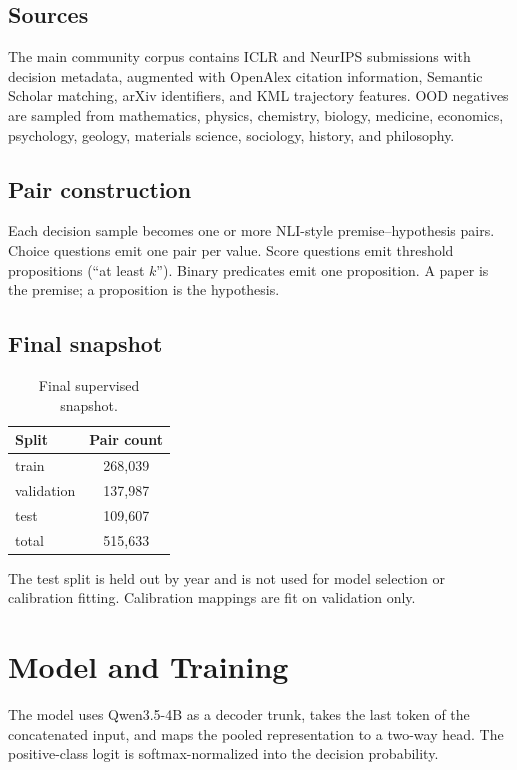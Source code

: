 \documentclass[11pt]{article}
\begin{document}
\subsection{Sources}

The main community corpus contains ICLR and NeurIPS submissions with decision
metadata, augmented with OpenAlex citation information, Semantic Scholar
matching, arXiv identifiers, and KML trajectory features. OOD negatives are
sampled from mathematics, physics, chemistry, biology, medicine, economics,
psychology, geology, materials science, sociology, history, and philosophy.

\subsection{Pair construction}

Each decision sample becomes one or more NLI-style premise--hypothesis pairs.
Choice questions emit one pair per value. Score questions emit threshold
propositions (``at least $k$''). Binary predicates emit one proposition. A paper
is the premise; a proposition is the hypothesis.

\subsection{Final snapshot}

\begin{table}[t]
\centering
\begin{tabular}{@{}lc@{}}
\toprule
Split & Pair count \\
\midrule
train & 268{,}039 \\
validation & 137{,}987 \\
test & 109{,}607 \\
\midrule
total & 515{,}633 \\
\bottomrule
\end{tabular}
\caption{Final supervised snapshot.}
\label{tab:data}
\end{table}

The test split is held out by year and is not used for model selection or
calibration fitting. Calibration mappings are fit on validation only.

\section{Model and Training}

The model uses Qwen3.5-4B as a decoder trunk, takes the last token of the
concatenated input, and maps the pooled representation to a two-way head. The
positive-class logit is softmax-normalized into the decision probability.
\end{document}
